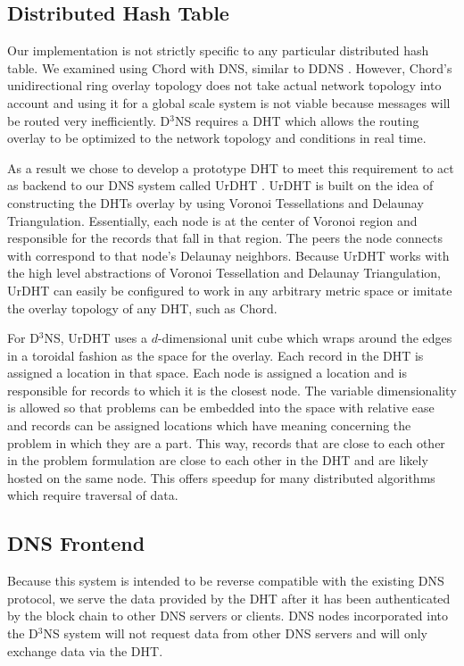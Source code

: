 \documentclass[11pt]{IEEEtran} %
\begin{document}
\subsection{Distributed Hash Table}
Our implementation is not strictly specific to any particular distributed hash table.  We examined using Chord \cite{chord} with DNS, similar to DDNS \cite{cox}.  However, Chord's unidirectional ring overlay topology does not take actual network topology into account and using it for a global scale system is not viable because messages will be routed very inefficiently. D$^3$NS requires a DHT which allows the routing overlay to be optimized to the network topology and conditions in real time.


As a result we chose to develop a prototype DHT to meet this requirement to act as backend to our DNS system called UrDHT \cite{urdht}. 
UrDHT is built on the idea of constructing the DHTs overlay by using Voronoi Tessellations and Delaunay Triangulation. 
Essentially, each node is at the center of Voronoi region and responsible for the records that fall in that region.
The peers the node connects with correspond to that node's Delaunay neighbors. 
Because UrDHT works with the high level abstractions of Voronoi Tessellation and Delaunay Triangulation, UrDHT can  easily be configured to work in any arbitrary metric space or imitate the overlay topology of any DHT, such as Chord.

For D$^{3}$NS, UrDHT uses a $d$-dimensional unit cube which wraps around the edges in a toroidal fashion as the space for the overlay.
Each record in the DHT is assigned a location in that space. 
Each node is assigned a location and is responsible for records to which it is the closest node.
The variable dimensionality is allowed so that problems can be embedded into the space with relative ease and records can be assigned locations which have meaning concerning the problem in which they are a part. 
This way, records that are close to each other in the problem formulation are close to each other in the DHT and are likely hosted on the same node. 
This offers speedup for many distributed algorithms which require traversal of data.


\subsection{DNS Frontend}
Because this system is intended to be reverse compatible with the existing DNS protocol, we serve the data provided by the DHT after it has been authenticated by the block chain to other DNS servers or clients. DNS nodes incorporated into the D$^3$NS system will not request data from other DNS servers and will only exchange data via the DHT.
\end{document}

